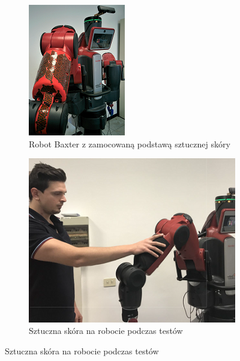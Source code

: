 \begin{figure}[!h]
  \begin{subfigure}[t]{0.36\linewidth}
    \centering
    \includegraphics[width=0.95\linewidth]{img/triangle4.png}
    \caption{Robot Baxter z zamocowaną podstawą sztucznej skóry} 
  \end{subfigure}
  \begin{subfigure}[t]{0.62\linewidth}
    \centering
    \includegraphics[width=0.95\linewidth]{img/triangle5.png}
    \caption{Sztuczna skóra na robocie podczas testów} 
  \end{subfigure}
  

\end{figure}
